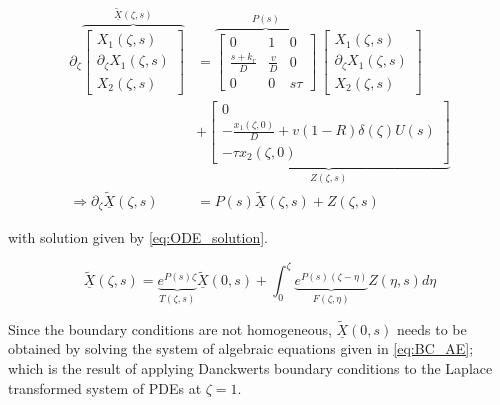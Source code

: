     \begin{equation} \label{eq:laplace_transformed}
    \begin{aligned}
        \partial_\zeta \overbrace{\begin{bmatrix}
            X_1(\zeta,s)\\ \partial_\zeta X_1(\zeta,s)\\ X_2(\zeta,s)
        \end{bmatrix}}^{\underline{\tilde{X}}(\zeta,s)} &= \overbrace{\begin{bmatrix}
            0 & 1 & 0\\
            \frac{s+k_r}{D} & \frac{v}{D} & 0\\
            0 & 0 & s\tau
            \end{bmatrix}}^{P(s)} \, \begin{bmatrix}
                X_1(\zeta,s)\\ \partial_\zeta X_1(\zeta,s)\\ X_2(\zeta,s)
            \end{bmatrix} \\
            &+ \underbrace{\begin{bmatrix}
                0\\ -\frac{x_1(\zeta,0)}{D} + v(1-R) \delta(\zeta) U(s)\\ -\tau x_2(\zeta,0)
            \end{bmatrix}}_{Z(\zeta,s)} \\
            \Rightarrow \partial_\zeta \underline{\tilde{X}}(\zeta,s) &= P(s) \underline{\tilde{X}}(\zeta,s) + Z(\zeta,s)
    \end{aligned}
    \end{equation} 
    
    with solution given by \eqref{eq:ODE_solution}.
    
    \begin{equation} \label{eq:ODE_solution}
        \underline{\tilde{X}}(\zeta,s) = \underbrace{e^{P(s)\zeta}}_{T(\zeta,s)} \underline{\tilde{X}}(0,s) + \int_0^\zeta \underbrace{e^{P(s)(\zeta - \eta)}}_{F(\zeta, \eta)} Z(\eta,s) d\eta
    \end{equation}
    
    Since the boundary conditions are not homogeneous, $\underline{\tilde{X}}(0,s)$ needs to be obtained by solving the system of algebraic equations given in \eqref{eq:BC_AE}; which is the result of applying Danckwerts boundary conditions to the Laplace transformed system of PDEs at $\zeta = 1$.
    

